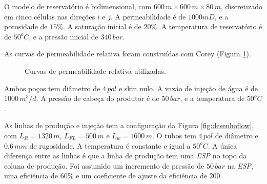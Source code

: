 \documentclass[final,5p]{elsarticle}
\numberwithin{equation}{section}
\begin{document}
        O modelo de reservatório é bidimensional, com $600\,m \times 600\,m \times 80\,m $, discretizado em cinco células nas direções $i$ e $j$. A permeabilidade é de $1000 mD$, e a porosidade de $15\%$. A saturação inicial é de $20\%$. A temperatura de reservatório é de $50^oC$, e a pressão inicial de $340\,bar$.

        As curvas de permeabilidade relativa foram construídas com Corey (Figura \ref{fig:kr}).

        \begin{figure}[hbt!]
            \caption{Curvas de permeabilidade relativa utilizadas.}
            \label{fig:kr}
        \end{figure}

        Ambos poços tem diâmetro de $4\,pol$ e skin nulo. A vazão de injeção de água é de $1000\,m^3/d$. A pressão de cabeça do produtor é de $50\,bar$, e a temperatura de $50^oC$.

        As linhas de produção e injeção tem a configuração da Figura \ref{fig:desenhoflow}, com $L_R = 1320\,m$, $L_{FL} = 500\,m$ e $L_w = 1600\,m$. O tubos tem $4\,pol$ de diâmetro e $0.6\,mm$ de rugosidade. A temperatura é constante e igual a $50^oC$. A única diferença entre as linhas é que a linha de produção tem uma \emph{ESP} no topo da coluna de produção. Foi assumido um incremento de pressão de $50\,bar$ na \emph{ESP}, uma eficiência de $60\%$ e um coeficiente de ajuste da eficiência de $200$.
\end{document}
